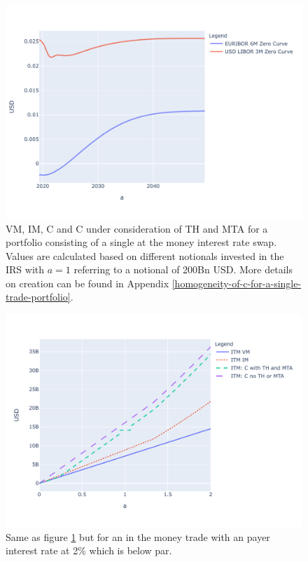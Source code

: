 \documentclass[../Thesis_AHoecherl.tex]{subfiles}
\begin{document}
    \begin{figure}
        \centering
        \includegraphics{Graphics/C_and_its_components_for_ATM_IRS.pdf}
        \caption{VM, IM, C and C under consideration of TH and MTA for a portfolio consisting of a single at the money interest rate swap. Values are calculated based on different notionals invested in the IRS with $a=1$ referring to a notional of 200Bn USD. More details on creation can be found in Appendix \ref{homogeneity-of-c-for-a-single-trade-portfolio}.}
        \label{fig:C for ATM IRS}
    \end{figure}

    \begin{figure}
        \centering
        \includegraphics{Graphics/C_and_its_components_for_ITM_IRS.pdf}
        \caption{Same as figure \ref{fig:C for ATM IRS} but for an in the money trade with an payer interest rate at 2\% which is below par.}
        \label{fig:C for ITM IRS}
    \end{figure}
    
\end{document}

